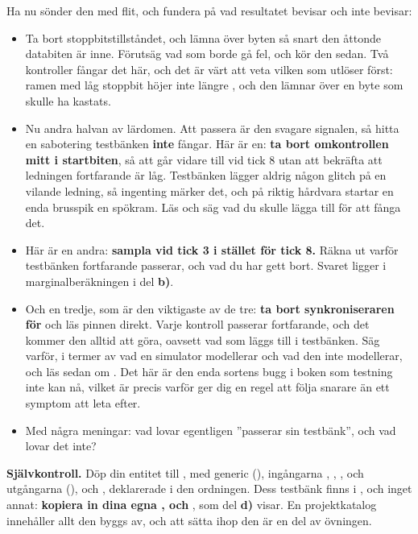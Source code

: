  Ha nu sönder den med flit, och fundera på vad resultatet bevisar och inte bevisar:
\begin{itemize}
  \item Ta bort stoppbitstillståndet, och lämna över byten så snart den åttonde databiten är inne.
    Förutsäg vad som borde gå fel, och kör den sedan. Två kontroller fångar det här, och det är värt
    att veta vilken som utlöser först: ramen med låg stoppbit höjer inte längre ,
    och den lämnar över en byte som skulle ha kastats.
  \item Nu andra halvan av lärdomen. Att passera är den svagare signalen, så hitta en sabotering
    testbänken \textbf{inte} fångar. Här är en: \textbf{ta bort omkontrollen mitt i startbiten}, så
    att  går vidare till  vid tick 8 utan att bekräfta att
    ledningen fortfarande är låg. Testbänken lägger aldrig någon glitch på en vilande ledning, så
    ingenting märker det, och på riktig hårdvara startar en enda brusspik en spökram. Läs
     och säg vad du skulle lägga till för att fånga det.
  \item Här är en andra: \textbf{sampla vid tick 3 i stället för tick 8.} Räkna ut varför testbänken
    fortfarande passerar, och vad du har gett bort. Svaret ligger i marginalberäkningen i del
    \textbf{b)}.
  \item Och en tredje, som är den viktigaste av de tre: \textbf{ta bort synkroniseraren för
    } och läs pinnen direkt. Varje kontroll passerar fortfarande, och det kommer den alltid
    att göra, oavsett vad som läggs till i testbänken. Säg varför, i termer av vad en simulator
    modellerar och vad den inte modellerar, och läs sedan om . Det här är den
    enda sortens bugg i boken som testning inte kan nå, vilket är precis varför  ger
    dig en regel att följa snarare än ett symptom att leta efter.
  \item Med några meningar: vad lovar egentligen ”passerar sin testbänk”, och vad lovar det inte?
\end{itemize}


\begin{selfcheck}
\textbf{Självkontroll.} Döp din entitet till , med generic
 (), ingångarna , , ,
och utgångarna  (),  och
, deklarerade i den ordningen. Dess testbänk finns i , och
inget annat: \textbf{kopiera in dina egna ,  och }, som del
\textbf{d)} visar. En projektkatalog innehåller allt den byggs av, och att sätta ihop den är en del
av övningen.
\end{selfcheck}

